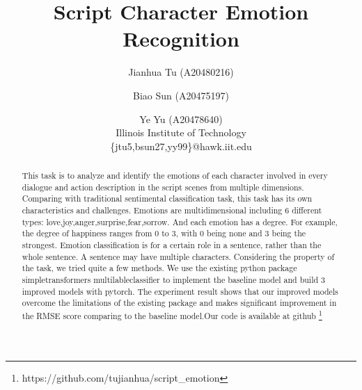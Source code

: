 \documentclass[12pt,twocolumn,letterpaper]{article}
\begin{document}
\title{Script Character Emotion Recognition}

\author{Jianhua Tu (A20480216)\\
\and Biao Sun (A20475197)\\
\and Ye Yu (A20478640)\\
Illinois Institute of Technology\\ 
\{jtu5,bsun27,yy99\}@hawk.iit.edu
}

\maketitle

\begin{abstract}
This task is to analyze and identify the emotions of each character involved in every dialogue and action description in the script scenes from multiple dimensions. Comparing with traditional sentimental classification task, this task has its own characteristics and challenges. Emotions are multidimensional including 6 different types: love,joy,anger,surprise,fear,sorrow. And each emotion has a degree. For example, the degree of happiness ranges from 0 to 3, with 0 being none and 3 being the strongest.  Emotion classification is for a certain role in a sentence, rather than the whole sentence. A sentence may have multiple characters.  Considering the property of the task, we tried quite a few methods. We use the existing python package simpletransformers multilableclassifier to implement the baseline model and build 3 improved models with pytorch. The experiment result shows that our improved models overcome the limitations of the existing package and makes significant improvement in the RMSE score comparing to the baseline model.Our code is available at github \footnote{https://github.com/tujianhua/script\_emotion}
\end{abstract}

\end{document}
